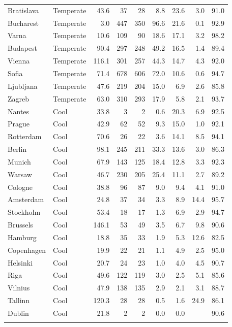 \begin{longtable}{llrrrrrrr}
  Bratislava & Temperate & 43.6 & 37 & 28 & 8.8 & 23.6 & 3.0 & 91.0 \\ 
  Bucharest & Temperate & 3.0 & 447 & 350 & 96.6 & 21.6 & 0.1 & 92.9 \\ 
  Varna & Temperate & 10.6 & 109 & 90 & 18.6 & 17.1 & 3.2 & 98.2 \\ 
  Budapest & Temperate & 90.4 & 297 & 248 & 49.2 & 16.5 & 1.4 & 89.4 \\ 
  Vienna & Temperate & 116.1 & 301 & 257 & 44.3 & 14.7 & 4.3 & 92.0 \\ 
  Sofia & Temperate & 71.4 & 678 & 606 & 72.0 & 10.6 & 0.6 & 94.7 \\ 
  Ljubljana & Temperate & 47.6 & 219 & 204 & 15.0 & 6.9 & 2.6 & 85.8 \\ 
  Zagreb & Temperate & 63.0 & 310 & 293 & 17.9 & 5.8 & 2.1 & 93.7 \\ 
  Nantes & Cool & 33.8 & 3 & 2 & 0.6 & 20.3 & 6.9 & 92.5 \\ 
  Prague & Cool & 42.9 & 62 & 52 & 9.3 & 15.0 & 1.0 & 92.1 \\ 
  Rotterdam & Cool & 70.6 & 26 & 22 & 3.6 & 14.1 & 8.5 & 94.1 \\ 
  Berlin & Cool & 98.1 & 245 & 211 & 33.3 & 13.6 & 3.0 & 86.3 \\ 
  Munich & Cool & 67.9 & 143 & 125 & 18.4 & 12.8 & 3.3 & 92.3 \\ 
  Warsaw & Cool & 46.7 & 230 & 205 & 25.4 & 11.1 & 2.7 & 89.2 \\ 
  Cologne & Cool & 38.8 & 96 & 87 & 9.0 & 9.4 & 4.1 & 91.0 \\ 
  Amsterdam & Cool & 24.8 & 37 & 34 & 3.3 & 8.9 & 14.4 & 95.7 \\ 
  Stockholm & Cool & 53.4 & 18 & 17 & 1.3 & 6.9 & 2.9 & 94.7 \\ 
  Brussels & Cool & 146.1 & 53 & 49 & 3.5 & 6.7 & 9.8 & 90.6 \\ 
  Hamburg & Cool & 18.8 & 35 & 33 & 1.9 & 5.3 & 12.6 & 82.5 \\ 
  Copenhagen & Cool & 19.9 & 22 & 21 & 1.1 & 4.9 & 2.5 & 95.0 \\ 
  Helsinki & Cool & 20.7 & 24 & 23 & 1.0 & 4.0 & 4.5 & 90.7 \\ 
  Riga & Cool & 49.6 & 122 & 119 & 3.0 & 2.5 & 5.1 & 85.6 \\ 
  Vilnius & Cool & 47.9 & 138 & 135 & 2.9 & 2.1 & 3.1 & 88.7 \\ 
  Tallinn & Cool & 120.3 & 28 & 28 & 0.5 & 1.6 & 24.9 & 86.1 \\ 
  Dublin & Cool & 21.8 & 2 & 2 & 0.0 & 0.0 &  & 90.6 \\ 
   \bottomrule
\label{tab:synergies_by_city}
\end{longtable}
\endgroup
